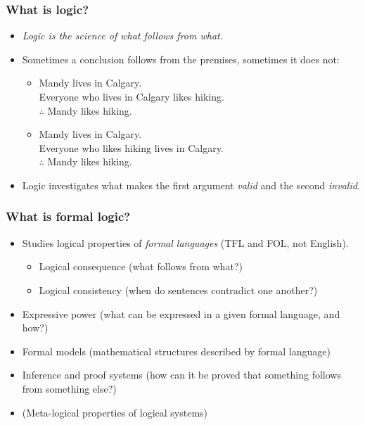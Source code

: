 \begin{frame}
  \frametitle{What is logic?}

  \begin{itemize}[<+->]
  \item \emph{Logic is the science of what follows from what.}
  \item Sometimes a conclusion follows from the premises, sometimes it
  does not:
  \begin{itemize}[<+->]
    \item Mandy lives in Calgary.\\ Everyone who lives in Calgary likes hiking.\\
    $\therefore$ Mandy likes hiking.
    \item Mandy lives in Calgary.\\ Everyone who likes hiking lives in Calgary.\\
    $\therefore$ Mandy likes hiking.
    \end{itemize}
  \item Logic investigates what makes the first argument \emph{valid}
    and the second \emph{invalid}.
  \end{itemize}
\end{frame}

\begin{frame}
  \frametitle{What is formal logic?}

  \begin{itemize}[<+->]
  \item Studies logical properties of \emph{formal languages} (TFL and
  FOL, not English).
    \begin{itemize}[<+->]
    \item Logical consequence (what follows from what?)
    \item Logical consistency (when do sentences contradict one another?)
    \end{itemize}
  \item Expressive power (what can be expressed in a given formal
  language, and how?)
  \item Formal models (mathematical structures described by formal language)
  \item Inference and proof systems (how can it be proved that something
  follows from something else?)
  \item (Meta-logical properties of logical systems)
  \end{itemize}
\end{frame}

